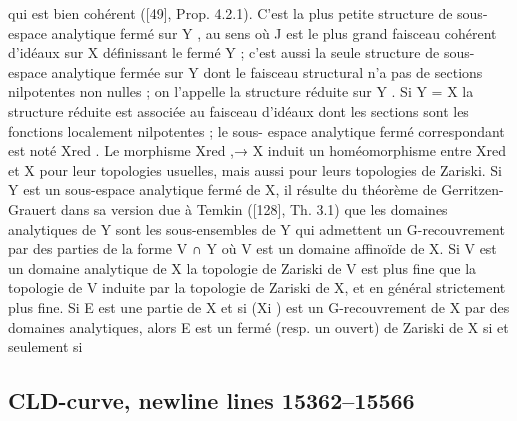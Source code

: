 \documentclass[
  10pt,
]{article}
\newenvironment{Shaded}{}{}
\newcommand{\NormalTok}[1]{#1}
\begin{document}
\begin{Shaded}
\begin{Highlighting}[]
\NormalTok{qui est bien cohérent ([49], Prop. 4.2.1). C’est la plus petite structure de sous{-}espace}
\NormalTok{analytique fermé sur Y , au sens où J est le plus grand faisceau cohérent d’idéaux}
\NormalTok{sur X définissant le fermé Y ; c’est aussi la seule structure de sous{-}espace analytique}
\NormalTok{fermée sur Y dont le faisceau structural n’a pas de sections nilpotentes non nulles ;}
\NormalTok{on l’appelle la structure réduite sur Y . Si Y = X la structure réduite est associée au}
\NormalTok{faisceau d’idéaux dont les sections sont les fonctions localement nilpotentes ; le sous{-}}
\NormalTok{espace analytique fermé correspondant est noté Xred . Le morphisme Xred ,→ X induit}
\NormalTok{un homéomorphisme entre Xred et X pour leur topologies usuelles, mais aussi pour leurs}
\NormalTok{topologies de Zariski.}
\NormalTok{   Si Y est un sous{-}espace analytique fermé de X, il résulte du théorème de Gerritzen{-}}
\NormalTok{Grauert dans sa version due à Temkin ([128], Th. 3.1) que les domaines analytiques de}
\NormalTok{Y sont les sous{-}ensembles de Y qui admettent un G{-}recouvrement par des parties de la}
\NormalTok{forme V ∩ Y où V est un domaine affinoïde de X.}
\NormalTok{   Si V est un domaine analytique de X la topologie de Zariski de V est plus fine que la}
\NormalTok{topologie de V induite par la topologie de Zariski de X, et en général strictement plus}
\NormalTok{fine.}
\NormalTok{   Si E est une partie de X et si (Xi ) est un G{-}recouvrement de X par des domaines}
\NormalTok{analytiques, alors E est un fermé (resp. un ouvert) de Zariski de X si et seulement si}
\end{Highlighting}
\end{Shaded}

\subsection{CLD-curve, newline lines
15362--15566}\label{cld-curve-newline-lines-1536215566}
\end{document}
